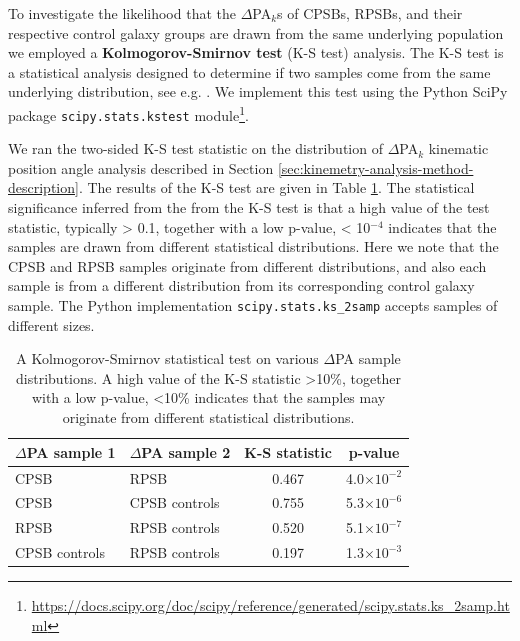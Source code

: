 To investigate the likelihood that the $\Delta$PA$_{k}$s of CPSBs, RPSBs, and their respective control galaxy groups are drawn from the same underlying population we employed a \textbf{Kolmogorov-Smirnov test} (K-S test) analysis. The K-S test is a statistical analysis designed to determine if two samples come from the same underlying distribution, see e.g. \citet{hodges1958significance}. We implement this test using the Python SciPy package \texttt{scipy.stats.kstest} module\footnote{\href{https://docs.scipy.org/doc/scipy/reference/generated/scipy.stats.ks\_2samp.html}{https://docs.scipy.org/doc/scipy/reference/generated/scipy.stats.ks\_2samp.html}}.

We ran the two-sided K-S test statistic on the distribution of $\Delta$PA$_{k}$ kinematic position angle analysis described in Section \ref{sec:kinemetry-analysis-method-description}. The results of the K-S test are given in Table \ref{tab:K-S-tests}. The statistical significance inferred from the from the K-S test is that a high value of the test statistic, typically > 0.1, together with a low p-value, < 10$^{-4}$ indicates that the samples are drawn from different statistical distributions. Here we note that the CPSB and RPSB samples originate from different distributions, and also each sample is from a different distribution from its corresponding control galaxy sample. The Python implementation \texttt{scipy.stats.ks\_2samp} accepts samples of different sizes.

\begin{table}
\caption[Kolmogorov-Smirnov statistical test of $\Delta$PA distributions]{A Kolmogorov-Smirnov statistical test on various $\Delta$PA sample distributions. A high value of the K-S statistic \textgreater 10\%, together with a low p-value, \textless 10\% indicates that the samples may originate from different statistical distributions.}
\label{tab:K-S-tests}
\begin{tabular}{llcc}
\hline
$\Delta$PA sample 1  & $\Delta$PA sample 2 & K-S statistic & p-value \\
\hline
CPSB & RPSB & 0.467 & 4.0$\times10^{-2}$ \\
CPSB & CPSB controls & 0.755 & 5.3$\times10^{-6}$ \\
RPSB & RPSB controls & 0.520 & 5.1$\times10^{-7}$ \\
CPSB controls & RPSB controls & 0.197 & 1.3$\times10^{-3}$ \\
\hline
\end{tabular}
\end{table}

